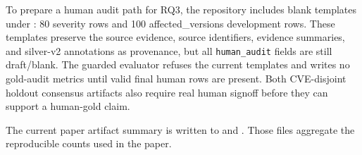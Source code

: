 To prepare a human audit path for RQ3, the repository includes blank templates under : 80 severity rows and 100 affected\_versions development rows. These templates preserve the source evidence, source identifiers, evidence summaries, and silver-v2 annotations as provenance, but all \texttt{human\_audit} fields are still draft/blank. The guarded evaluator  refuses the current templates and writes no gold-audit metrics until valid final human rows are present. Both CVE-disjoint holdout consensus artifacts also require real human signoff before they can support a human-gold claim.

The current paper artifact summary is written to  and . Those files aggregate the reproducible counts used in the paper.
